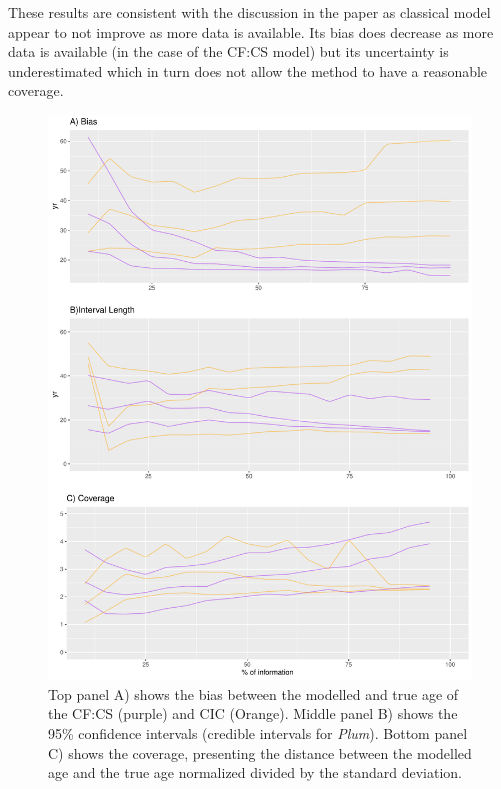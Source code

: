 \documentclass [10pt] {article}
\begin{document}
These results are consistent with the discussion in the paper as classical model appear to not improve as more data is available. Its bias does decrease as more data is available (in the case of the CF:CS model) but its uncertainty is underestimated which in turn does not allow the method to have a reasonable coverage. 


\begin{figure}
	\begin{centering}
		\includegraphics[width = 13cm]{AccPrec-appendix.pdf}
		\caption{ Top panel A) shows the bias between the modelled and true age of the CF:CS (purple) and CIC (Orange). Middle panel B) shows the 95\% confidence intervals (credible intervals for \textit{Plum}). Bottom panel C) shows the coverage, presenting the distance between the modelled age and the true age normalized divided by the standard deviation. }
		\label{fig:CIC-CFCS}
	\end{centering}
\end{figure}
\end{document}
